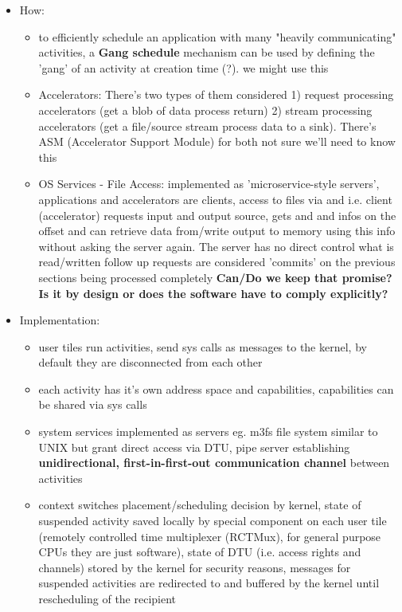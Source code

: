 \begin{itemize}

    \item How: 
    \begin{itemize}
        \item to efficiently schedule an application with many "heavily communicating" activities, a \textbf{Gang schedule} mechanism can be used  by defining the 'gang' of an activity at creation time (?). \means we might use this 
        \item Accelerators: There's two types of them considered 1) request processing accelerators (get a blob of data \means process \means return) 2) stream processing accelerators (get a file/source \means stream process data to a sink). There's ASM (Accelerator Support Module) for both \means not sure we'll need to know this
        \item OS Services - File Access: implemented as 'microservice-style servers', applications and accelerators are clients, access to files via  and  i.e. client (accelerator) requests input and output source, gets  and  and infos on the offset and can retrieve data from/write output to memory using this info without asking the server again. The server has no direct control what is read/written \means follow up requests are considered 'commits' on the previous sections being processed completely \means \textbf{Can/Do we keep that promise? Is it by design or does the software have to comply explicitly?}
    \end{itemize}
    \item Implementation: 
    \begin{itemize}
        \item user tiles \means run activities, send sys calls as messages to the kernel, by default they are disconnected from each other
        \item each activity has it's own address space and capabilities, capabilities can be shared via sys calls
        \item system services implemented as servers \means eg. m3fs file system similar to UNIX but grant direct access via DTU, pipe server establishing \textbf{ unidirectional, first-in-first-out communication channel} between activities
        \item context switches \means  placement/scheduling decision by kernel, state of suspended activity saved locally by special component on each user tile (remotely controlled time multiplexer (RCTMux), for general purpose CPUs they are just software), state of DTU (i.e. access rights and channels) stored by the kernel for security reasons, messages for suspended activities are redirected to and buffered by the kernel until rescheduling of the recipient

\end{itemize}
\end{itemize}
